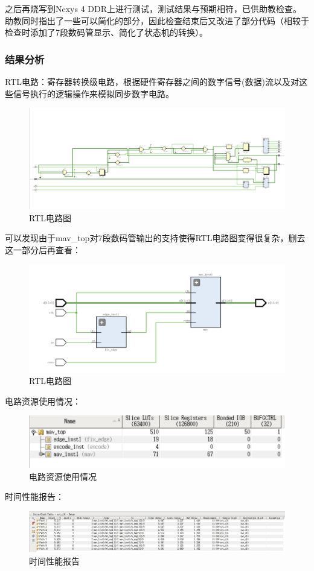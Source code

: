 \documentclass[a4paper]{article}
\begin{document}
之后再烧写到Nexys 4 DDR上进行测试，测试结果与预期相符，已供助教检查。助教同时指出了一些可以简化的部分，因此检查结束后又改进了部分代码（相较于检查时添加了7段数码管显示、简化了状态机的转换）。

\subsubsection{结果分析}
RTL电路：寄存器转换级电路，根据硬件寄存器之间的数字信号(数据)流以及对这些信号执行的逻辑操作来模拟同步数字电路。
\begin{figure}[H]
  \centering
  \includegraphics[width=1.0\textwidth]{rtl.png}
  \caption{RTL电路图}
  \label{fig:mav_rtl}
\end{figure}
可以发现由于mav\_top对7段数码管输出的支持使得RTL电路图变得很复杂，删去这一部分后再查看：
\begin{figure}[H]
  \centering
  \includegraphics[width=1.0\textwidth]{rtl_1.png}
  \caption{RTL电路图}
  \label{fig:mav_rtl_1}
\end{figure}

电路资源使用情况：
\begin{figure}[H]
  \centering
  \includegraphics[width=1.0\textwidth]{mav_cir.png}
  \caption{电路资源使用情况}
  \label{fig:mav_cir}
\end{figure}
时间性能报告：
\begin{figure}[H]
  \centering
  \includegraphics[width=1.0\textwidth]{mav_time.png}
  \caption{时间性能报告}
  \label{fig:mav_time}
\end{figure}
\end{document}
